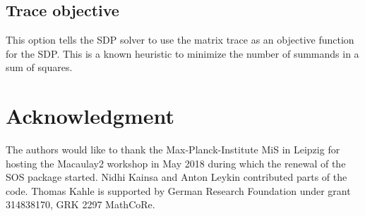 \documentclass[11pt]{amsart}
\theoremstyle{plain}%
\theoremstyle{definition}
\theoremstyle{remark}
\newcommand{\Mac}{Macaulay2\xspace}
\begin{document}
\subsection*{Trace objective}
This option tells the SDP solver to use the matrix trace as an objective function for the SDP.
This is a known heuristic to minimize the number of summands in a sum of squares.


\section*{Acknowledgment}
\label{sec:acknowledgement}
The authors would like to thank the Max-Planck-Institute MiS in Leipzig for hosting the \Mac workshop in May 2018 during which the renewal of the SOS package started.
Nidhi Kainsa and Anton Leykin contributed parts of the code.
Thomas Kahle is supported by German Research Foundation under grant 314838170, GRK 2297 MathCoRe.



\end{document}
